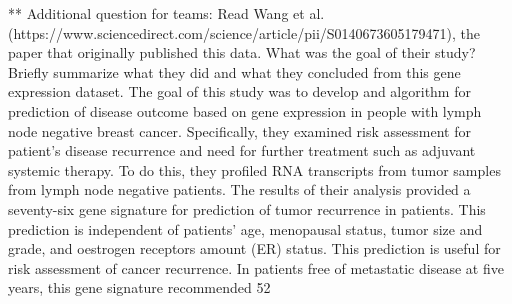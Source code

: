 ** Additional question for teams: Read Wang et al.
(https://www.sciencedirect.com/science/article/pii/S0140673605179471), the paper that
originally published this data. What was the goal of their study? Briefly summarize
what they did and what they concluded from this gene expression dataset.
	The goal of this study was to develop and algorithm for prediction of disease outcome based on gene expression in people with lymph node negative breast cancer. Specifically, they examined risk assessment for patient’s disease recurrence and need for further treatment such as adjuvant systemic therapy. To do this, they profiled RNA transcripts from tumor samples from lymph node negative patients. The results of their analysis provided a seventy-six gene signature for prediction of tumor recurrence in patients. This prediction is independent of patients’ age, menopausal status, tumor size and grade, and oestrogen receptors amount (ER) status. This prediction is useful for risk assessment of cancer recurrence. In patients free of metastatic disease at five years, this gene signature recommended 52%
